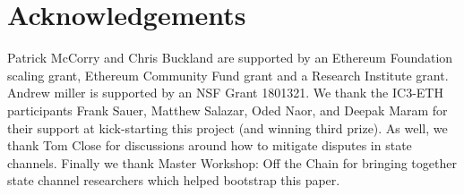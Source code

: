 \documentclass{llncs}
\begin{document}
	
	
	
	
	
	\section{Acknowledgements}
	
	Patrick McCorry and Chris Buckland are supported by an Ethereum Foundation scaling grant, Ethereum Community Fund grant and a Research Institute grant. 
	Andrew miller is supported by an NSF Grant 1801321.
	We thank the IC3-ETH participants Frank Sauer, Matthew Salazar, Oded Naor, and Deepak Maram for their support at kick-starting this project (and winning third prize).
	As well, we thank Tom Close for discussions around how to mitigate disputes in state channels. Finally we thank Master Workshop: Off the Chain for bringing together state channel researchers which helped bootstrap this paper. 
	
\end{document}
